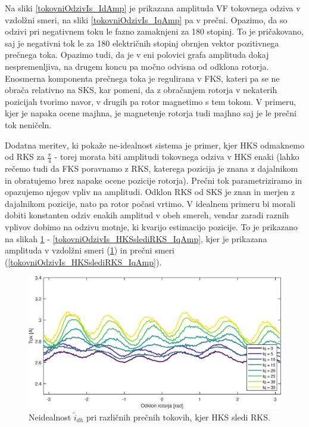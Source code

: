 \documentclass[a4paper,twoside,openright,12pt,slovene]{book}
\begin{document}
Na sliki \ref{tokovniOdzivIs_IdAmp} je prikazana amplituda VF tokovnega odziva v vzdolžni smeri, na sliki \ref{tokovniOdzivIs_IqAmp} pa v prečni. Opazimo, da so odzivi pri negativnem toku le fazno
zamaknjeni za 180 stopinj. To je pričakovano, saj je negativni tok le za 180 električnih stopinj obrnjen vektor pozitivnega prečnega toka. Opazimo tudi, da je v eni polovici grafa amplituda dokaj
nespremenljiva, na drugem koncu pa močno odvisna od odklona rotorja. Enosmerna komponenta prečnega toka je regulirana v FKS, kateri pa se ne obrača relativno na SKS, kar pomeni, da z obračanjem
rotorja v nekaterih pozicijah tvorimo navor, v drugih pa rotor magnetimo s tem tokom. V primeru, kjer je napaka ocene majhna, je magnetenje rotorja tudi majhno saj je le prečni tok neničeln.

Dodatna meritev, ki pokaže ne-idealnost sistema je primer, kjer HKS odmaknemo od RKS za $\frac{\pi}{4}$ - torej morata biti amplitudi tokovnega odziva v HKS enaki (lahko rečemo tudi da FKS poravnamo z
RKS, katerega pozicija je znana z dajalnikom in obratujemo brez napake ocene pozicije rotorja). Prečni tok parametriziramo in opazujemo njegov vpliv na amplitudi. Odklon RKS od SKS je znan in merjen z
dajalnikom pozicije, nato pa rotor počasi vrtimo.  V idealnem primeru bi morali dobiti konstanten odziv enakih amplitud v obeh smereh, vendar zaradi raznih vplivov dobimo na odzivu motnje, ki kvarijo
estimacijo pozicije. To je prikazano na slikah \ref{tokovniOdzivIs_HKSslediRKS_IdAmp} - \ref{tokovniOdzivIs_HKSslediRKS_IqAmp}, kjer je prikazana amplituda v vzdolžni smeri
(\ref{tokovniOdzivIs_HKSslediRKS_IdAmp}) in prečni smeri (\ref{tokovniOdzivIs_HKSslediRKS_IqAmp}).
\newpage

\begin{figure}[!htbp]
    \centering
    \includegraphics[width=0.95\columnwidth]{Slike/tokovniOdzivIs_HKSslediRKS_IdAmp.eps}
    \caption{\label{tokovniOdzivIs_HKSslediRKS_IdAmp} Neidealnost $\hat{i}_{dh}$ pri različnih prečnih tokovih, kjer HKS sledi RKS.}
\end{figure}
\end{document}
